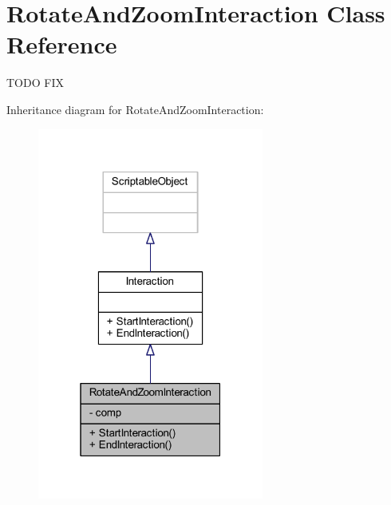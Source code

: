 \hypertarget{class_rotate_and_zoom_interaction}{}\section{Rotate\+And\+Zoom\+Interaction Class Reference}
\label{class_rotate_and_zoom_interaction}


T\+O\+DO F\+IX  




Inheritance diagram for Rotate\+And\+Zoom\+Interaction\+:
\nopagebreak
\begin{figure}[H]
\begin{center}
\leavevmode
\includegraphics[width=211pt]{class_rotate_and_zoom_interaction__inherit__graph}
\end{center}
\end{figure}



